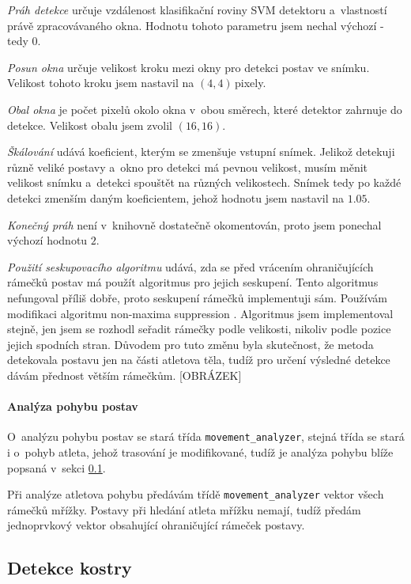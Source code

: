 \emph{Práh detekce} určuje vzdálenost klasifikační roviny SVM detektoru a~vlastností právě zpracovávaného okna. Hodnotu tohoto parametru jsem nechal výchozí - tedy $0$.

\emph{Posun okna} určuje velikost kroku mezi okny pro detekci postav ve snímku. Velikost tohoto kroku jsem nastavil na $(4,4)$\,\rm pixely.

\emph{Obal okna} je počet pixelů okolo okna v~obou směrech, které detektor zahrnuje do detekce. Velikost obalu jsem zvolil $(16,16)$.

\emph{Škálování} udává koeficient, kterým se zmenšuje vstupní snímek. Jelikož detekuji různě veliké postavy a~okno pro detekci má pevnou velikost, musím měnit velikost snímku a~detekci spouštět na různých velikostech. Snímek tedy po každé detekci zmenším daným koeficientem, jehož hodnotu jsem nastavil na $1.05$.

\emph{Konečný práh} není v~knihovně dostatečně okomentován, proto jsem ponechal výchozí hodnotu $2$.

\emph{Použití seskupovacího algoritmu} udává, zda se před vrácením ohraničujících rámečků postav má použít algoritmus pro jejich seskupení. Tento algoritmus nefungoval příliš dobře, proto seskupení rámečků implementuji sám. Používám modifikaci algoritmu non-maxima suppression \citep{NMS}. Algoritmus jsem implementoval stejně, jen jsem se rozhodl seřadit rámečky podle velikosti, nikoliv podle pozice jejich spodních stran. Důvodem pro tuto změnu byla skutečnost, že metoda detekovala postavu jen na části atletova těla, tudíž pro určení výsledné detekce dávám přednost větším rámečkům. [OBRÁZEK]

\paragraph{Analýza pohybu postav}

O~analýzu pohybu postav se stará třída \texttt{movement\_analyzer}, stejná třída se stará i o~pohyb atleta, jehož trasování je modifikované, tudíž je analýza pohybu blíže popsaná v~sekci \ref{ssec:detekce}.

Při analýze atletova pohybu předávám třídě \texttt{movement\_analyzer} vektor všech rámečků mřížky. Postavy při hledání atleta mřížku nemají, tudíž předám jednoprvkový vektor obsahující ohraničující rámeček postavy.



\subsection{Detekce kostry}
\label{ssec:detekce}

